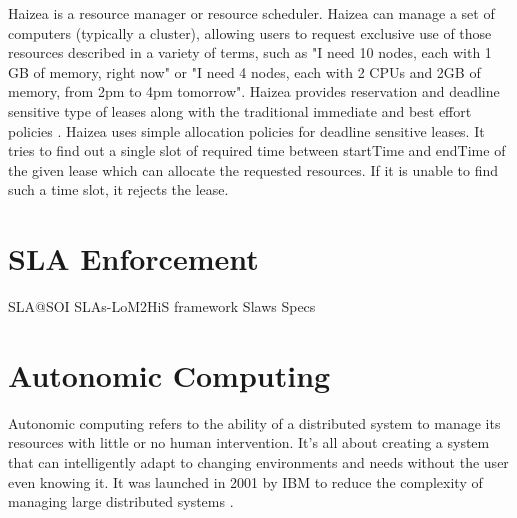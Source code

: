 Haizea \cite{haizea2} is a resource manager or resource scheduler. Haizea  can manage a set of computers (typically a cluster), allowing users to request exclusive use of those resources described in a variety of terms, such as "I need 10 nodes, each with 1 GB of memory, right now" or "I need 4 nodes, each with 2 CPUs and 2GB of memory, from 2pm to 4pm tomorrow". Haizea provides reservation and deadline sensitive type of leases along with the traditional immediate and best effort policies \cite{haizea1} \cite{haizea3} \cite{haizea4}. Haizea uses simple allocation policies for deadline sensitive leases. It tries to find out a single slot of required time between startTime and endTime of the given lease which can allocate the requested resources. If it is unable to ﬁnd such a time slot, it rejects the lease. 

\section{SLA Enforcement}
SLA@SOI
SLAs-LoM2HiS framework
Slaws
Specs
\section{Autonomic Computing}
Autonomic computing refers to the ability of a distributed system to manage its resources with little or no human intervention. It's all about creating a system that can intelligently adapt to changing environments and needs without the user even knowing it. It was launched in 2001 by IBM to reduce the complexity of managing large distributed systems \cite{horn2001autonomic}.


